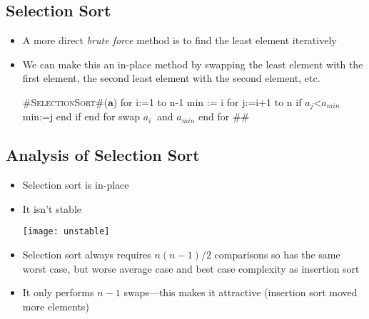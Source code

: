 \begin{slide}
\section[-2]{Selection Sort}

\pausebuild
\color{TwoColor}
\begin{itemize}
\item A more direct \emph{brute force} method is to find the least
  element iteratively\pauseh
\item We can make this an in-place method by swapping the least element
  with the first element, the second least element with the second
  element, etc.\pauseh\\
  \begin{minipage}{8cm}
    \begin{pseudo}
#\textsc{SelectionSort}#($\bm{a}$)
{
  for i:=1 to n-1
    min := i
    for j:=i+1 to n
      if $a_{j}$<$a_{min}$
        min:=j
      end if
    end for
    swap $a_i\ $ and $a_{min}$
  end for
}#\pauseh#      
    \end{pseudo}
  \end{minipage}\hfil
  \begin{minipage}{13cm}
    \pause
  \end{minipage}
\end{itemize}
\end{slide}


\begin{slide}
\section[-1]{Analysis of Selection Sort}

\begin{PauseHighLight}
  \begin{itemize}
  \item Selection sort is in-place\pause
  \item It isn't stable
    \begin{center}
      \texttt{[image: unstable]}\pause
    \end{center}
  \item Selection sort always requires $n(n-1)/2$ comparisons so has the
    same worst case, but worse average case and best case complexity as
    insertion sort\pause
  \item It only performs $n-1$ swaps---this makes it attractive
    (insertion sort moved more elements)\pause
  \end{itemize}
\end{PauseHighLight}

\end{slide}


